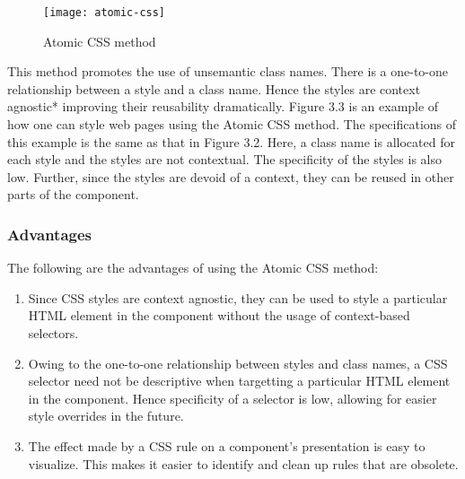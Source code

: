 \documentclass[12pt]{article}
\begin{document}
\vspace{0.5cm}

\begin{figure}[h]
\texttt{[image: atomic-css]}
\centering
\caption{Atomic CSS method}
\end{figure}

\vspace{0.5cm}

This method promotes the use of unsemantic class names. There is a one-to-one relationship between a style and a class name. Hence the styles are context agnostic* improving their reusability dramatically. Figure 3.3 is an example of how one can style web pages using the Atomic CSS method. The specifications of this example is the same as that in Figure 3.2. Here, a class name is allocated for each style and the styles are not contextual. The specificity of the styles is also low. Further, since the styles are devoid of a context, they can be reused in other parts of the component.

\subsubsection{Advantages}
The following are the advantages of using the Atomic CSS method:
\begin{enumerate}
	\item Since CSS styles are context agnostic, they can be used to style a particular HTML element in the component without the usage of context-based selectors.

	\item Owing to the one-to-one relationship between styles and class names, a CSS selector need not be descriptive when targetting a particular HTML element in the component. Hence specificity of a selector is low, allowing for easier style overrides in the future.

	\item The effect made by a CSS rule on a component's presentation is easy to visualize. This makes it easier to identify and clean up rules that are obsolete.
\end{enumerate}
\end{document}
